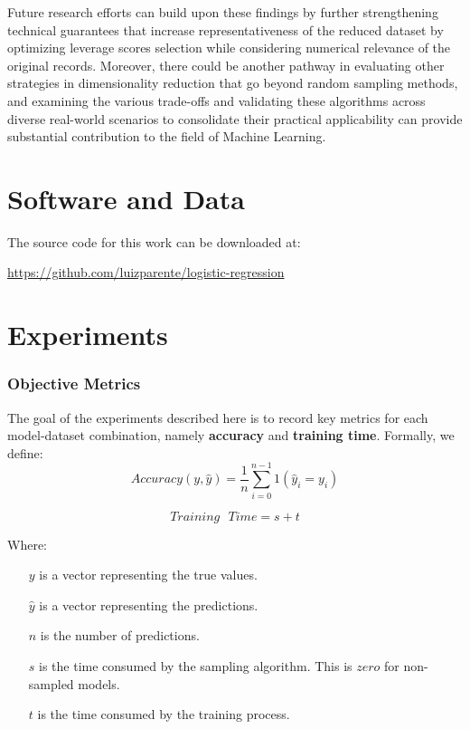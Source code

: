 \documentclass{article}
\theoremstyle{plain}
\theoremstyle{definition}
\theoremstyle{remark}
\begin{document}
Future research efforts can build upon these findings by further strengthening technical guarantees that increase representativeness of the reduced dataset by optimizing leverage scores selection while considering numerical relevance of the original records. Moreover, there could be another pathway in evaluating other strategies in dimensionality reduction that go beyond random sampling methods, and examining the various trade-offs and validating these algorithms across diverse real-world scenarios to consolidate their practical applicability can provide substantial contribution to the field of Machine Learning.


\section*{Software and Data}

The source code for this work can be downloaded at:

\url{https://github.com/luizparente/logistic-regression}






\newpage
\appendix
\twocolumn
\section{Experiments}

\subsubsection{Objective Metrics}

The goal of the experiments described here is to record key metrics for each model-dataset combination, namely \textbf{accuracy} and \textbf{training time}. Formally, we define:
$$
Accuracy(y, \hat{y}) = \frac{1}{n} \sum_{i=0}^{n-1} 1(\hat{y}_i = y_i)
$$

$$
Training\text{ }Time = s + t
$$

Where:

\begin{itemize}

\item[$y$] is a vector representing the true values.
\item[$\hat{y}$] is a vector representing the predictions.
\item[$n$] is the number of predictions.
\item[$s$] is the time consumed by the sampling algorithm. This is $zero$ for non-sampled models.
\item[$t$] is the time consumed by the training process.

\end{itemize}
\end{document}
